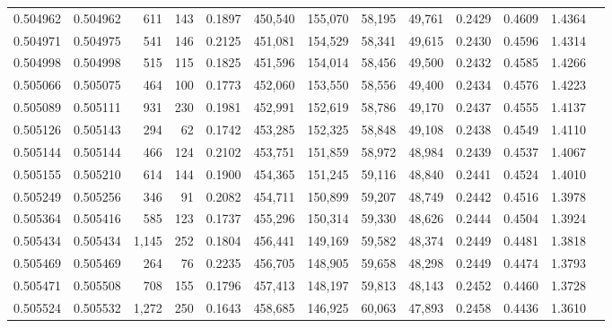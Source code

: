 \begin{tabular}{rrrrrrrrrrrrr}
0.504962 & 0.504962 &   611 &   143 &                                     0.1897 & 450,540 & 155,070 &  58,195 &  49,761 & 0.2429 & 0.4609 & 1.4364 \\
0.504971 & 0.504975 &   541 &   146 &                                     0.2125 & 451,081 & 154,529 &  58,341 &  49,615 & 0.2430 & 0.4596 & 1.4314 \\
0.504998 & 0.504998 &   515 &   115 &                                     0.1825 & 451,596 & 154,014 &  58,456 &  49,500 & 0.2432 & 0.4585 & 1.4266 \\
0.505066 & 0.505075 &   464 &   100 &                                     0.1773 & 452,060 & 153,550 &  58,556 &  49,400 & 0.2434 & 0.4576 & 1.4223 \\
0.505089 & 0.505111 &   931 &   230 &                                     0.1981 & 452,991 & 152,619 &  58,786 &  49,170 & 0.2437 & 0.4555 & 1.4137 \\
0.505126 & 0.505143 &   294 &    62 &                                     0.1742 & 453,285 & 152,325 &  58,848 &  49,108 & 0.2438 & 0.4549 & 1.4110 \\
0.505144 & 0.505144 &   466 &   124 &                                     0.2102 & 453,751 & 151,859 &  58,972 &  48,984 & 0.2439 & 0.4537 & 1.4067 \\
0.505155 & 0.505210 &   614 &   144 &                                     0.1900 & 454,365 & 151,245 &  59,116 &  48,840 & 0.2441 & 0.4524 & 1.4010 \\
0.505249 & 0.505256 &   346 &    91 &                                     0.2082 & 454,711 & 150,899 &  59,207 &  48,749 & 0.2442 & 0.4516 & 1.3978 \\
0.505364 & 0.505416 &   585 &   123 &                                     0.1737 & 455,296 & 150,314 &  59,330 &  48,626 & 0.2444 & 0.4504 & 1.3924 \\
0.505434 & 0.505434 & 1,145 &   252 &                                     0.1804 & 456,441 & 149,169 &  59,582 &  48,374 & 0.2449 & 0.4481 & 1.3818 \\
0.505469 & 0.505469 &   264 &    76 &                                     0.2235 & 456,705 & 148,905 &  59,658 &  48,298 & 0.2449 & 0.4474 & 1.3793 \\
0.505471 & 0.505508 &   708 &   155 &                                     0.1796 & 457,413 & 148,197 &  59,813 &  48,143 & 0.2452 & 0.4460 & 1.3728 \\
0.505524 & 0.505532 & 1,272 &   250 &                                     0.1643 & 458,685 & 146,925 &  60,063 &  47,893 & 0.2458 & 0.4436 & 1.3610 \\

\end{tabular}
